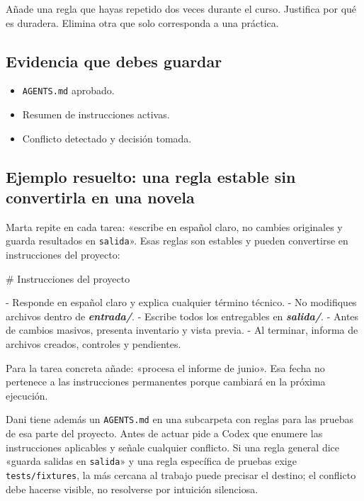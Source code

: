 \documentclass[10pt,a4paper,openany]{book}
\providecommand{\tightlist}{\setlength{\itemsep}{0.18em}\setlength{\parskip}{0pt}}
\newenvironment{Shaded}{}{}
\newcommand{\FunctionTok}[1]{\textcolor[rgb]{0.02,0.16,0.49}{#1}}
\newcommand{\InformationTok}[1]{\textcolor[rgb]{0.38,0.63,0.69}{\textbf{\textit{#1}}}}
\newcommand{\NormalTok}[1]{#1}
\newcommand{\SpecialStringTok}[1]{\textcolor[rgb]{0.73,0.40,0.53}{#1}}
\renewenvironment{Shaded}
  {\begin{tcolorbox}[
    enhanced,
    breakable,
    colback=CodeBg,
    colframe=Border,
    boxrule=0.5pt,
    arc=2mm,
    left=3mm,
    right=3mm,
    top=2.2mm,
    bottom=2.2mm,
    before skip=0.8em,
    after skip=0.9em
  ]}
  {\end{tcolorbox}}
\begin{document}
Añade una regla que hayas repetido dos veces durante el curso. Justifica
por qué es duradera. Elimina otra que solo corresponda a una práctica.

\subsection{Evidencia que debes
guardar}\label{evidencia-que-debes-guardar-15}

\begin{itemize}
\tightlist
\item
  \texttt{AGENTS.md} aprobado.
\item
  Resumen de instrucciones activas.
\item
  Conflicto detectado y decisión tomada.
\end{itemize}

\subsection{Ejemplo resuelto: una regla estable sin convertirla en una
novela}\label{ejemplo-resuelto-una-regla-estable-sin-convertirla-en-una-novela}

Marta repite en cada tarea: «escribe en español claro, no cambies
originales y guarda resultados en \texttt{salida}». Esas reglas son
estables y pueden convertirse en instrucciones del proyecto:

\begin{Shaded}
\begin{Highlighting}[]
\FunctionTok{\# Instrucciones del proyecto}

\SpecialStringTok{{-} }\NormalTok{Responde en español claro y explica cualquier término técnico.}
\SpecialStringTok{{-} }\NormalTok{No modifiques archivos dentro de }\InformationTok{\textasciigrave{}entrada/\textasciigrave{}}\NormalTok{.}
\SpecialStringTok{{-} }\NormalTok{Escribe todos los entregables en }\InformationTok{\textasciigrave{}salida/\textasciigrave{}}\NormalTok{.}
\SpecialStringTok{{-} }\NormalTok{Antes de cambios masivos, presenta inventario y vista previa.}
\SpecialStringTok{{-} }\NormalTok{Al terminar, informa de archivos creados, controles y pendientes.}
\end{Highlighting}
\end{Shaded}

Para la tarea concreta añade: «procesa el informe de junio». Esa fecha
no pertenece a las instrucciones permanentes porque cambiará en la
próxima ejecución.

Dani tiene además un \texttt{AGENTS.md} en una subcarpeta con reglas
para las pruebas de esa parte del proyecto. Antes de actuar pide a Codex
que enumere las instrucciones aplicables y señale cualquier conflicto.
Si una regla general dice «guarda salidas en \texttt{salida}» y una
regla específica de pruebas exige \texttt{tests/fixtures}, la más
cercana al trabajo puede precisar el destino; el conflicto debe hacerse
visible, no resolverse por intuición silenciosa.
\end{document}
